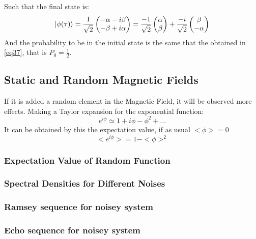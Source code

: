 \documentclass{article}
\begin{document}
Such that the final state is:
\begin{equation}\label{eq39}\ket{\phi(\tau)}=\frac{1}{\sqrt{2}}\begin{pmatrix} -\alpha-i\beta \\ -\beta+i\alpha \end{pmatrix}=\frac{-1}{\sqrt{2}}\begin{pmatrix}\alpha \\ \beta\end{pmatrix}+\frac{-i}{\sqrt{2}}\begin{pmatrix}\beta\\ -\alpha\end{pmatrix}\end{equation}
And the probability to be in the initial state is the same that the obtained in \ref{eq37}, that is $P_0=\frac{1}{2}$.
\subsection{Static and Random Magnetic Fields}
If it is added a random element in the Magnetic Field, it will be observed more effects. Making a Taylor expansion for the exponential function:
\begin{equation}\label{eq40}e^{i\phi}\simeq 1+i\phi-\phi^2+...\end{equation}
It can be obtained by this the expectation value, if as usual $<\phi>=0$
\begin{equation}\label{eq41}<e^{i\phi}>=1-<\phi>^2\end{equation}
\subsubsection{Expectation Value of Random Function}
\subsubsection{Spectral Densities for Different Noises}
\subsubsection{Ramsey sequence for noisey system}
\subsubsection{Echo sequence for noisey system}
\end{document}
